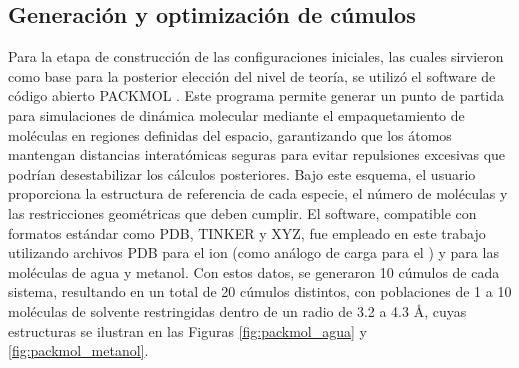 \subsection{Generación y optimización de cúmulos}
\label{section-optimización}
Para la etapa de construcción de las configuraciones iniciales, las cuales sirvieron como base para la posterior elección del nivel de teoría, se utilizó el software de código abierto PACKMOL \cite{packmol}. Este programa permite generar un punto de partida para simulaciones de dinámica molecular mediante el empaquetamiento de moléculas en regiones definidas del espacio, garantizando que los átomos mantengan distancias interatómicas seguras para evitar repulsiones excesivas que podrían desestabilizar los cálculos posteriores. Bajo este esquema, el usuario proporciona la estructura de referencia de cada especie, el número de moléculas y las restricciones geométricas que deben cumplir. El software, compatible con formatos estándar como PDB, TINKER y XYZ, fue empleado en este trabajo utilizando archivos PDB para el ion  (como análogo de carga para el ) y para las moléculas de agua y metanol. Con estos datos, se generaron 10 cúmulos de cada sistema, resultando en un total de 20 cúmulos distintos, con poblaciones de 1 a 10 moléculas de solvente restringidas dentro de un radio de 3.2 a 4.3 Å, cuyas estructuras se ilustran en las Figuras \ref{fig:packmol_agua} y \ref{fig:packmol_metanol}.
